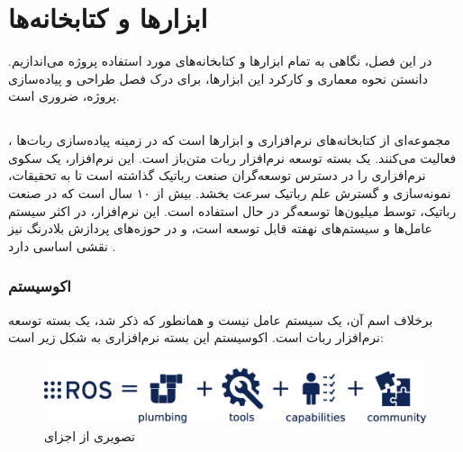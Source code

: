 \chapter{ابزارها و کتابخانه‌ها}

در این فصل، نگاهی به تمام ابزار‌ها و کتابخانه‌‌های مورد استفاده پروژه می‌اندازیم. دانستن نحوه معماری و کارکرد این ابزارها، برای درک فصل طراحی و پیاده‌سازی پروژه، ضروری است.

\section{}
، مجموعه‌ای از کتابخانه‌های نرم‌افزاری و ابزارها است که در زمینه پیاده‌سازی ربات‌ها فعالیت ‌می‌کنند.  یک بسته توسعه نرم‌افزار ربات متن‌باز است. این نرم‌افزار،‌ یک سکوی نرم‌افزاری را در دسترس توسعه‌گران صنعت رباتیک گذاشته است تا به تحقیقات، نمونه‌سازی‌ و گسترش علم رباتیک سرعت بخشد. 
 بیش از ۱۰ سال است که در صنعت رباتیک، توسط میلیون‌ها توسعه‌گر در حال استفاده است. این نرم‌افزار، در اکثر سیستم‌ عامل‌ها و سیستم‌های نهفته قابل توسعه است، و در حوزه‌های پردازش بلادرنگ نیز نقشی اساسی دارد \cite{doi:10.1126/scirobotics.abm6074}.

\subsection{اکوسیستم}
برخلاف اسم ‌آن،  یک سیستم‌ عامل نیست و همانطور که ذکر شد، یک بسته توسعه نرم‌افزار ربات است. اکوسیستم این بسته نرم‌افزاری به شکل زیر است:

\begin{figure}[h!]
    \centering
    \includegraphics[width=1\linewidth]{figures/ROS_Ecosystem.png}
    \caption{تصویری از اجزای  \cite{ROS:2023}}
    \label{fig:ROS_ecosystem}
\end{figure}

